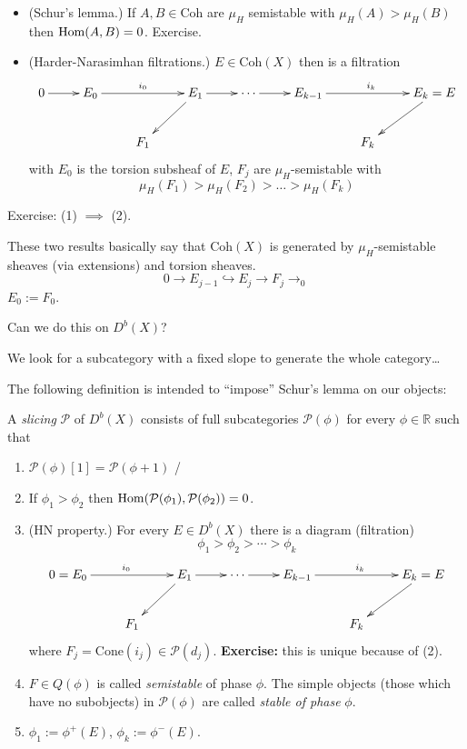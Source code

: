 \begin{itemize}
\item (Schur's lemma.) If $A,B \in
\text{Coh}$ are $\mu_H$ semistable with
$\mu_H(A)>\mu_H(B)$ then $\mathop{\mathrm{Hom}}\nolimits(A,B)=0$.
Exercise.
\item (Harder-Narasimhan filtrations.) $E \in
\text{Coh}(X)$ then is a
filtration
$$
\xymatrix{
0\ar[r]&E_0\ar[rr]^{i_0}&&E_1\ar[dl]\ar[r]&
\cdots\ar[r]
&E_{k-1}\ar[rr]^{i_k}&&E_k=E\ar[dl]\\
&&F_1& & & & F_k
}
$$
with $E_0$ is the torsion
subsheaf of $ E$, $F_j$ are
$\mu_H$-semistable with
$$
\mu_H(F_1)>\mu_H(F_2)>\ldots>\mu_H(F_k)
$$
\end{itemize}

Exercise: (1) $\implies$ (2).

These two results basically say that
$\text{Coh}(X)$ is generated by
$\mu_H$-semistable sheaves (via extensions)
and torsion sheaves.
$$
0\to E_{j-1}\hookrightarrow E_j\to F_j\to_0
$$
$E_0:=F_0$.

Can we do this on $D^b(X)$?

We look for a subcategory with a fixed slope
to generate the whole category\ldots{}

\medskip

The following definition is intended to
``impose'' Schur's lemma on our objects:

\begin{definition}
\label{definition-slicing}

A {\it slicing} $\mathcal{P}$ of $D^b(X)$
consists of full subcategories
$\mathcal{P}(\phi)$ for every $\phi \in
\mathbb{R}$ such that
\begin{enumerate}
\item
$\mathcal{P}(\phi)[1]=\mathcal{P}(\phi+1)$ /
\item If $\phi_1>\phi_2$ then
$\mathop{\mathrm{Hom}}\nolimits(\mathcal{P}(\phi_1),\mathcal{P}(\phi_2)
)
=0$.
\item (HN property.) For every $E \in D^b(X)$
there is a diagram (filtration)
$$
\phi_1>\phi_2>\cdots>\phi_k
$$
$$
\xymatrix{
0=E_0\ar[rr]^{i_0}&&E_1\ar[dl]\ar[r]&
\cdots\ar[r]
&E_{k-1}\ar[rr]^{i_k}&&E_k=E\ar[dl]\\
&F_1& & & & F_k
}
$$
where $F_j=\text{Cone}(i_j) \in
\mathcal{P}(d_j)$. {\bf Exercise:} this is
unique because of (2).

\item  $F \in Q(\phi)$ is called {\it
semistable} of phase $\phi$. The simple
objects
(those which have no subobjects) in
$\mathcal{P}(\phi)$ are called {\it stable of
phase} $\phi$.

\item  $\phi_1:=\phi^+(E)$,
$\phi_k:=\phi^-(E)$.
\end{enumerate}
\end{definition}

